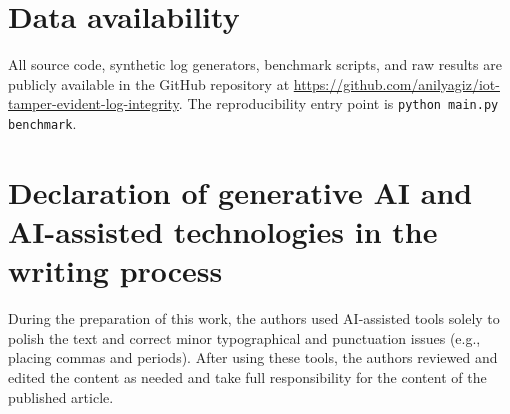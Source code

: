 \documentclass[preprint,12pt]{elsarticle}
\begin{document}
\section*{Data availability}
All source code, synthetic log generators, benchmark scripts, and raw results are publicly available in the GitHub repository at \url{https://github.com/anilyagiz/iot-tamper-evident-log-integrity}.
The reproducibility entry point is \texttt{python main.py benchmark}.

\section*{Declaration of generative AI and AI-assisted technologies in the writing process}
During the preparation of this work, the authors used AI-assisted tools solely to polish the text and correct minor typographical and punctuation issues (e.g., placing commas and periods). After using these tools, the authors reviewed and edited the content as needed and take full responsibility for the content of the published article.



\end{document}
